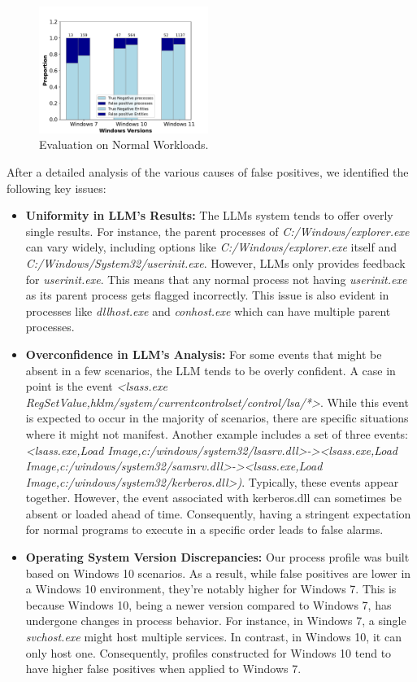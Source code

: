 \begin{figure}[h]
    \centering
      \includegraphics[width=0.49\textwidth]{figs/normal_chart.pdf}
    \caption{Evaluation on Normal Workloads.}
    \label{fig-eva-normal}
\end{figure}

\smallskip
{}
After a detailed analysis of the various causes of false positives, we identified the following key issues:

\begin{itemize}
    \item \textbf{Uniformity in LLM's Results:} The LLMs system tends to offer overly single results. For instance, the parent processes of \textit{C:/Windows/explorer.exe} can vary widely, including options like \textit{C:/Windows/explorer.exe} itself and \textit{C:/Windows/System32/userinit.exe}. However, LLMs only provides feedback for \textit{userinit.exe}. This means that any normal process not having \textit{userinit.exe} as its parent process gets flagged incorrectly. This issue is also evident in processes like \textit{dllhost.exe} and \textit{conhost.exe} which can have multiple parent processes.
    \item \textbf{Overconfidence in LLM's Analysis:} For some events that might be absent in a few scenarios, the LLM tends to be overly confident. A case in point is the event \textit{<lsass.exe RegSetValue,hklm/system/currentcontrolset/control/lsa/*>}. While this event is expected to occur in the majority of scenarios, there are specific situations where it might not manifest.  Another example includes a set of three events:\textit{<lsass.exe,Load Image,c:/windows/system32/lsasrv.dll>-><lsass.exe,Load Image,c:/windows/system32/samsrv.dll>-><lsass.exe,Load Image,c:/windows/system32/kerberos.dll>)}. Typically, these events appear together. However, the event associated with kerberos.dll can sometimes be absent or loaded ahead of time. Consequently, having a stringent expectation for normal programs to execute in a specific order leads to false alarms.
    \item \textbf{Operating System Version Discrepancies:} Our process profile was built based on Windows 10 scenarios. As a result, while false positives are lower in a Windows 10 environment, they're notably higher for Windows 7. This is because Windows 10, being a newer version compared to Windows 7, has undergone changes in process behavior. For instance, in Windows 7, a single \textit{svchost.exe} might host multiple services. In contrast, in Windows 10, it can only host one. Consequently, profiles constructed for Windows 10 tend to have higher false positives when applied to Windows 7.
\end{itemize}


